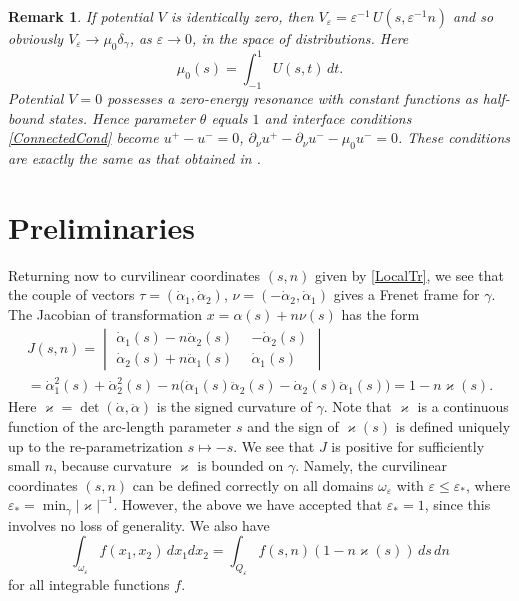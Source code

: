 \documentclass[reqno]{amsart}
\theoremstyle{plain}
\newtheorem{rem}{Remark}
\numberwithin{equation}{section}
\renewcommand{\kappa}{\varkappa}
\newcommand{\eps}{\varepsilon}
\renewcommand{\leq}{\leqslant}
\begin{document}
\begin{rem}
  If potential $V$ is identically zero, then $V_\eps=\eps^{-1}\,U\left(s,\eps^{-1}n\right)$ and so obviously
$V_\eps\to \mu_0 \delta_\gamma$, as $\eps\to 0$, in the space of distributions. Here
\begin{equation}\label{Mu0}
  \mu_0(s)=\int_{-1}^1U(s,t)\, dt.
\end{equation}
Potential $V=0$ possesses a zero-energy resonance with constant functions as  half-bound states. Hence parameter $\theta$ equals  $1$ and interface conditions \eqref{ConnectedCond} become
$ u^+- u^-=0$,  $\partial_\nu u^+-\partial_\nu u^-
-\mu_0 u^-=0$. These conditions are exactly the same as that obtained in \cite{BehrndtExnerHolzmannLotoreichik2017}.
\end{rem}







\section{Preliminaries}

Returning now to curvilinear coordinates $(s,n)$ given by \eqref{LocalTr},
we see that the couple of vectors
$ \tau=(\dot{\alpha}_1, \dot{\alpha}_2)$, $\nu=(-\dot{\alpha}_2, \dot{\alpha}_1)$
gives a Frenet frame for $\gamma$.
The Jacobian of transformation $x=\alpha(s)+n\nu(s)$ has the form
\begin{multline*}
J(s,n)=
\begin{vmatrix}
  \dot{\alpha}_1(s)-n\ddot{\alpha}_2(s)& -\dot{\alpha}_2(s)\\
          \dot{\alpha}_2(s)+n\ddot{\alpha}_1(s)\phantom{0} & \dot{\alpha}_1(s)
\end{vmatrix}
\\
=\dot{\alpha}_1^2(s)+\dot{\alpha}_2^2(s)
-n\big(\dot{\alpha}_1(s)\ddot{\alpha}_2(s)-
  \dot{\alpha}_2(s)\ddot{\alpha}_1(s)\big)=1-n \kappa(s).
\end{multline*}
Here $\kappa=\det(\dot{\alpha},\ddot{\alpha})$ is the signed curvature of $\gamma$. Note that $\kappa$ is a continuous function
of the arc-length parameter $s$ and the sign of $\kappa(s)$ is defined uniquely up to the re-parametrization $s\mapsto-s$.
We see that $J$ is positive for sufficiently small $n$, because  curvature $\kappa$  is  bounded on $\gamma$.
Namely, the curvilinear coordinates $(s,n)$ can be defined correctly on all domains $\omega_\eps$ with $\eps\leq \eps_*$, where
$\eps_*=\min_{\gamma}|\kappa|^{-1}$.
However, the above we have accepted that $\eps_*=1$, since this
involves no loss of generality. We also have
\begin{equation}\label{IntegralCh}
  \int_{\omega_\eps} f(x_1,x_2)\,dx_1dx_2=\int_{Q_\eps} f(s,n)(1-n\kappa(s))\,ds\,dn
\end{equation}
for all integrable functions $f$.
\end{document}
